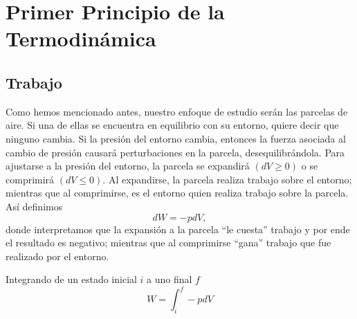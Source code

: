 \documentclass[openany]{book}
\begin{document}
\chapter{Primer Principio de la Termodinámica}
\section{Trabajo}
Como hemos mencionado antes, nuestro enfoque de estudio serán las parcelas de aire. Si una de ellas se encuentra en equilibrio con su entorno, quiere decir que ninguno cambia. Si la presión del entorno cambia, entonces la fuerza asociada al cambio de presión causará perturbaciones en la parcela, desequilibrándola. Para ajustarse a la presión del entorno, la parcela se expandirá $(dV\geq0)$ o se comprimirá $(dV\leq0)$. Al expandirse, la parcela realiza trabajo sobre el entorno; mientras que al comprimirse, es el entorno quien realiza trabajo sobre la parcela. Así definimos
\begin{equation}\label{eq:dW}
	dW=-pdV,
\end{equation}
donde interpretamos que la expansión a la parcela ``le cuesta'' trabajo y por ende el resultado es negativo; mientras que al comprimirse ``gana'' trabajo que fue realizado por el entorno.\par
Integrando de un estado inicial $i$ a uno final $f$
\begin{equation*}
	W=\!\int_{i}^{f}{\!-pdV}
\end{equation*}
\end{document}
